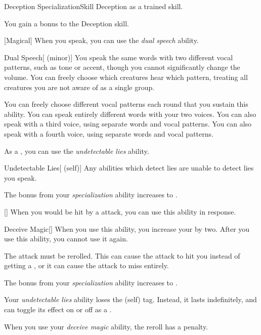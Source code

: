     \begin{feat}{Deception Specialization}{Skill}
        \featpre Deception as a trained skill.

         You gain a  bonus to the Deception skill.

        [Magical] When you speak, you can use the \textit{dual speech} ability.
        \begin{freeability}{Dual Speech}[ (minor)]
            You speak the same words with two different vocal patterns, such as tone or accent, though you cannot significantly change the volume.
            You can freely choose which creatures hear which pattern, treating all creatures you are not aware of as a single group. 

            You can freely choose different vocal patterns each round that you sustain this ability.
            \rankline
             You can speak entirely different words with your two voices.
             You can also speak with a third voice, using separate words and vocal patterns.
             You can also speak with a fourth voice, using separate words and vocal patterns.
        \end{freeability}

         As a , you can use the \textit{undetectable lies} ability.
        \begin{attuneability}{Undetectable Lies}[ (self)]
            Any  abilities which detect lies are unable to detect lies you speak.
        \end{attuneability}

         The bonus from your \textit{specialization} ability increases to .

        [] When you would be hit by a  attack, you can use this ability in response.
        \begin{freeability}{Deceive Magic}[]
            When you use this ability, you increase your  by two.
            After you use this ability, you  cannot use it again.

            The attack must be rerolled.
            This can cause the attack to hit you instead of getting a , or it can cause the attack to miss entirely.
        \end{freeability}

         The bonus from your \textit{specialization} ability increases to .

         Your \textit{undetectable lies} ability loses the  (self) tag.
        Instead, it lasts indefinitely, and can toggle its effect on or off as a .

         When you use your \textit{deceive magic} ability, the reroll has a   penalty.
    \end{feat}

